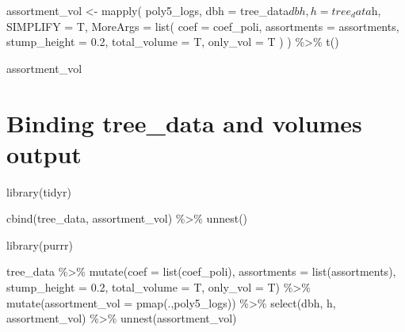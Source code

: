 \documentclass[
]{article}
\begin{document}
assortment\_vol \textless- mapply( poly5\_logs, dbh =
tree\_data\(dbh,  h = tree_data\)h, SIMPLIFY = T, MoreArgs = list( coef
= coef\_poli, assortments = assortments, stump\_height = 0.2,
total\_volume = T, only\_vol = T ) ) \%\textgreater\% t()

assortment\_vol

\hypertarget{binding-tree_data-and-volumes-output}{%
\section{Binding tree\_data and volumes
output}\label{binding-tree_data-and-volumes-output}}

library(tidyr)

cbind(tree\_data, assortment\_vol) \%\textgreater\% unnest()

library(purrr)

tree\_data \%\textgreater\% mutate(coef = list(coef\_poli), assortments
= list(assortments), stump\_height = 0.2, total\_volume = T, only\_vol =
T) \%\textgreater\% mutate(assortment\_vol = pmap(.,poly5\_logs))
\%\textgreater\% select(dbh, h, assortment\_vol) \%\textgreater\%
unnest(assortment\_vol)
\end{document}
